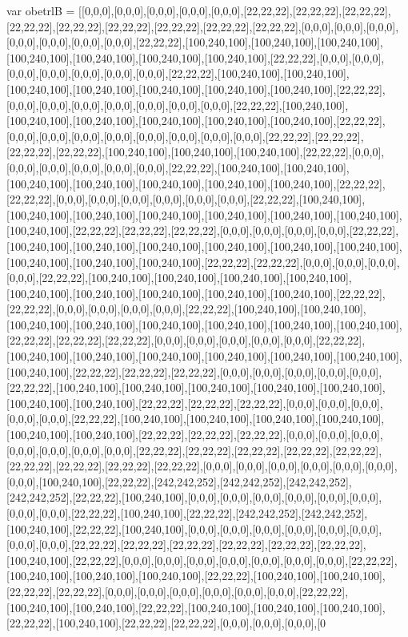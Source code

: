 var obetrlB = [[0,0,0],[0,0,0],[0,0,0],[0,0,0],[0,0,0],[22,22,22],[22,22,22],[22,22,22],[22,22,22],[22,22,22],[22,22,22],[22,22,22],[22,22,22],[22,22,22],[0,0,0],[0,0,0],[0,0,0],[0,0,0],[0,0,0],[0,0,0],[0,0,0],[22,22,22],[100,240,100],[100,240,100],[100,240,100],[100,240,100],[100,240,100],[100,240,100],[100,240,100],[22,22,22],[0,0,0],[0,0,0],[0,0,0],[0,0,0],[0,0,0],[0,0,0],[0,0,0],[22,22,22],[100,240,100],[100,240,100],[100,240,100],[100,240,100],[100,240,100],[100,240,100],[100,240,100],[22,22,22],[0,0,0],[0,0,0],[0,0,0],[0,0,0],[0,0,0],[0,0,0],[0,0,0],[22,22,22],[100,240,100],[100,240,100],[100,240,100],[100,240,100],[100,240,100],[100,240,100],[22,22,22],[0,0,0],[0,0,0],[0,0,0],[0,0,0],[0,0,0],[0,0,0],[0,0,0],[0,0,0],[22,22,22],[22,22,22],[22,22,22],[22,22,22],[100,240,100],[100,240,100],[100,240,100],[22,22,22],[0,0,0],[0,0,0],[0,0,0],[0,0,0],[0,0,0],[0,0,0],[22,22,22],[100,240,100],[100,240,100],[100,240,100],[100,240,100],[100,240,100],[100,240,100],[100,240,100],[22,22,22],[22,22,22],[0,0,0],[0,0,0],[0,0,0],[0,0,0],[0,0,0],[0,0,0],[22,22,22],[100,240,100],[100,240,100],[100,240,100],[100,240,100],[100,240,100],[100,240,100],[100,240,100],[100,240,100],[22,22,22],[22,22,22],[22,22,22],[0,0,0],[0,0,0],[0,0,0],[0,0,0],[22,22,22],[100,240,100],[100,240,100],[100,240,100],[100,240,100],[100,240,100],[100,240,100],[100,240,100],[100,240,100],[100,240,100],[22,22,22],[22,22,22],[0,0,0],[0,0,0],[0,0,0],[0,0,0],[22,22,22],[100,240,100],[100,240,100],[100,240,100],[100,240,100],[100,240,100],[100,240,100],[100,240,100],[100,240,100],[100,240,100],[22,22,22],[22,22,22],[0,0,0],[0,0,0],[0,0,0],[0,0,0],[22,22,22],[100,240,100],[100,240,100],[100,240,100],[100,240,100],[100,240,100],[100,240,100],[100,240,100],[100,240,100],[22,22,22],[22,22,22],[22,22,22],[0,0,0],[0,0,0],[0,0,0],[0,0,0],[0,0,0],[22,22,22],[100,240,100],[100,240,100],[100,240,100],[100,240,100],[100,240,100],[100,240,100],[100,240,100],[22,22,22],[22,22,22],[22,22,22],[0,0,0],[0,0,0],[0,0,0],[0,0,0],[0,0,0],[22,22,22],[100,240,100],[100,240,100],[100,240,100],[100,240,100],[100,240,100],[100,240,100],[100,240,100],[22,22,22],[22,22,22],[22,22,22],[0,0,0],[0,0,0],[0,0,0],[0,0,0],[0,0,0],[22,22,22],[100,240,100],[100,240,100],[100,240,100],[100,240,100],[100,240,100],[100,240,100],[22,22,22],[22,22,22],[22,22,22],[0,0,0],[0,0,0],[0,0,0],[0,0,0],[0,0,0],[0,0,0],[0,0,0],[22,22,22],[22,22,22],[22,22,22],[22,22,22],[22,22,22],[22,22,22],[22,22,22],[22,22,22],[22,22,22],[0,0,0],[0,0,0],[0,0,0],[0,0,0],[0,0,0],[0,0,0],[0,0,0],[100,240,100],[22,22,22],[242,242,252],[242,242,252],[242,242,252],[242,242,252],[22,22,22],[100,240,100],[0,0,0],[0,0,0],[0,0,0],[0,0,0],[0,0,0],[0,0,0],[0,0,0],[0,0,0],[22,22,22],[100,240,100],[22,22,22],[242,242,252],[242,242,252],[100,240,100],[22,22,22],[100,240,100],[0,0,0],[0,0,0],[0,0,0],[0,0,0],[0,0,0],[0,0,0],[0,0,0],[0,0,0],[22,22,22],[22,22,22],[22,22,22],[22,22,22],[22,22,22],[22,22,22],[100,240,100],[22,22,22],[0,0,0],[0,0,0],[0,0,0],[0,0,0],[0,0,0],[0,0,0],[0,0,0],[22,22,22],[100,240,100],[100,240,100],[100,240,100],[22,22,22],[100,240,100],[100,240,100],[22,22,22],[22,22,22],[0,0,0],[0,0,0],[0,0,0],[0,0,0],[0,0,0],[0,0,0],[22,22,22],[100,240,100],[100,240,100],[22,22,22],[100,240,100],[100,240,100],[100,240,100],[22,22,22],[100,240,100],[22,22,22],[22,22,22],[0,0,0],[0,0,0],[0,0,0],[0